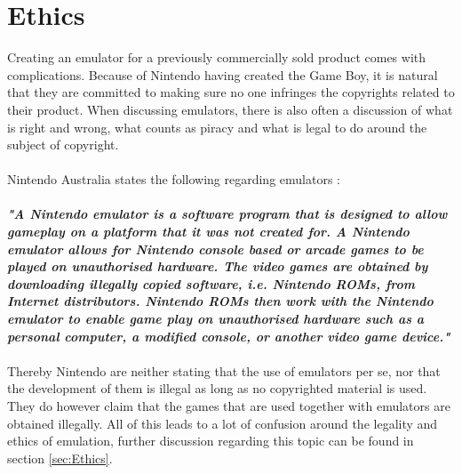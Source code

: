 \section{Ethics}
\label{sec:introEthics}
Creating an emulator for a previously commercially sold product comes with complications. Because of Nintendo having created the Game Boy, it is natural that they are committed to making sure no one infringes the copyrights related to their product. When discussing emulators, there is also often a discussion of what is right and wrong, what counts as piracy and what is legal to do around the subject of copyright. 
\\\\
Nintendo Australia  states the following regarding emulators \cite{NintendoCopyright}:
\\\\
\textit{\textbf{"A Nintendo emulator is a software program that is designed to allow gameplay on a platform that it was not created for. A Nintendo emulator allows for Nintendo console based or arcade games to be played on unauthorised hardware. The video games are obtained by downloading illegally copied software, i.e. Nintendo ROMs, from Internet distributors. Nintendo ROMs then work with the Nintendo emulator to enable game play on unauthorised hardware such as a personal computer, a modified console, or another video game device."}}
\\\\
Thereby Nintendo are neither stating that the use of emulators per se, nor that the development of them is illegal as long as no copyrighted material is used. They do however claim that the games that are used together with emulators are obtained illegally. All of this leads to a lot of confusion around the legality and ethics of emulation, further discussion regarding this topic can be found in section \ref{sec:Ethics}.



